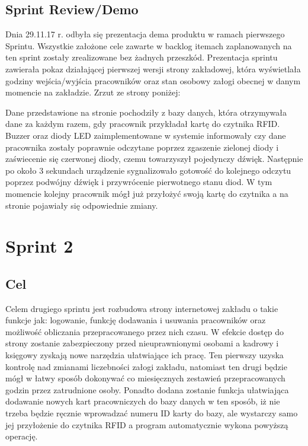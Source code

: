 \documentclass[a4paper]{article}
\begin{document}
\subsection{Sprint Review/Demo}

Dnia 29.11.17 r. odbyła się prezentacja dema produktu w ramach pierwszego Sprintu. Wszystkie założone cele zawarte w backlog itemach zaplanowanych na ten sprint zostały zrealizowane bez żadnych przeszkód. Prezentacja sprintu zawierała pokaz działającej pierwszej wersji strony zakładowej, która wyświetlała godziny wejścia/wyjścia pracowników oraz stan osobowy załogi obecnej w danym momencie na zakładzie.    
Zrzut ze strony poniżej:
\begin{figure}[!htbp]
\end{figure}

Dane przedstawione na stronie pochodziły z bazy danych, która otrzymywała dane za każdym razem, gdy pracownik przykładał kartę do czytnika RFID. Buzzer oraz diody LED  zaimplementowane w systemie informowały czy dane pracownika zostały poprawnie odczytane  poprzez zgaszenie  zielonej diody i zaświecenie się czerwonej diody, czemu towarzyszył pojedynczy dźwięk. Następnie po około 3 sekundach urządzenie sygnalizowało gotowość do kolejnego odczytu poprzez podwójny dźwięk i przywrócenie pierwotnego stanu diod. W tym momencie kolejny pracownik mógł już przyłożyć swoją kartę do czytnika a na stronie pojawiały się odpowiednie zmiany.

\section{Sprint 2}

\subsection{Cel} Celem drugiego sprintu jest rozbudowa strony internetowej zakładu o takie funkcje jak: logowanie, funkcję dodawania i usuwania pracowników oraz możliwość obliczania przepracowanego przez nich czasu. W efekcie dostęp do strony zostanie zabezpieczony przed nieuprawnionymi osobami a kadrowy i księgowy zyskają nowe narzędzia ułatwiające ich pracę. Ten pierwszy uzyska kontrolę nad zmianami liczebności załogi zakładu, natomiast ten drugi będzie mógł w łatwy sposób dokonywać co miesięcznych zestawień przepracowanych godzin przez zatrudnione osoby. Ponadto dodana zostanie funkcja ułatwiająca dodawanie nowych kart pracowniczych do bazy danych w ten sposób, iż nie trzeba będzie ręcznie wprowadzać numeru ID karty do bazy, ale wystarczy samo jej przyłożenie do czytnika RFID a program automatycznie wykona powyższą operację.
\end{document}
